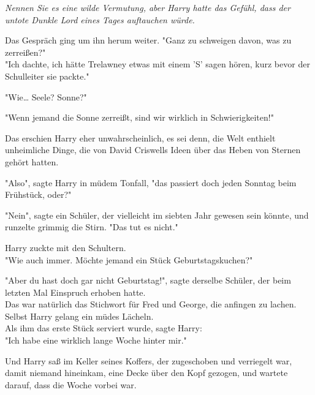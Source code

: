 {\emph{Nennen Sie es eine wilde Vermutung, aber Harry hatte das Gefühl, dass der untote Dunkle Lord eines Tages auftauchen würde.}

Das Gespräch ging um ihn herum weiter. "Ganz zu schweigen davon, was zu zerreißen?"\\ "Ich dachte, ich hätte Trelawney etwas mit einem 'S' sagen hören, kurz bevor der Schulleiter sie packte."

"Wie… Seele? Sonne?"

"Wenn jemand die Sonne zerreißt, sind wir wirklich in Schwierigkeiten!"

Das erschien Harry eher unwahrscheinlich, es sei denn, die Welt enthielt unheimliche Dinge, die von David Criswells Ideen über das Heben von Sternen gehört hatten.

"Also", sagte Harry in müdem Tonfall, "das passiert doch jeden Sonntag beim Frühstück, oder?"

"Nein", sagte ein Schüler, der vielleicht im siebten Jahr gewesen sein könnte, und runzelte grimmig die Stirn. "Das tut es nicht."

Harry zuckte mit den Schultern.\\ "Wie auch immer. Möchte jemand ein Stück Geburtstagskuchen?"

"Aber du hast doch gar nicht Geburtstag!", sagte derselbe Schüler, der beim letzten Mal Einspruch erhoben hatte.\\ Das war natürlich das Stichwort für Fred und George, die anfingen zu lachen.\\ Selbst Harry gelang ein müdes Lächeln.\\ Als ihm das erste Stück serviert wurde, sagte Harry:\\ "Ich habe eine wirklich lange Woche hinter mir."

Und Harry saß im Keller seines Koffers, der zugeschoben und verriegelt war, damit niemand hineinkam, eine Decke über den Kopf gezogen, und wartete darauf, dass die Woche vorbei war.

}
